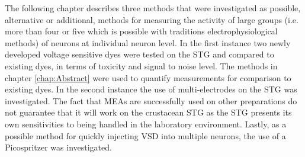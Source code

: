 The following chapter describes three methods that were investigated as possible, alternative or additional, methods for measuring the activity of large groups (i.e. more than four or five which is possible with traditions electrophysiological methods) of neurons at individual neuron level. In the first instance two newly developed voltage sensitive dyes were tested on the \ac{STG} and compared to existing dyes, in terms of toxicity and signal to noise level. The methods in chapter \ref{chap:Abstract} were used to quantify measurements for comparison to existing dyes. In the second instance the use of multi-electrodes on the \ac{STG} was investigated. The fact that \acp{MEA} are successfully used on other preparations do not guarantee that it will work on the crustacean \ac{STG} as the \ac{STG} presents its own sensitivities to being handled in the laboratory environment. Lastly, as a possible method for quickly injecting \ac{VSD} into multiple neurons, the use of a Picospritzer was investigated.